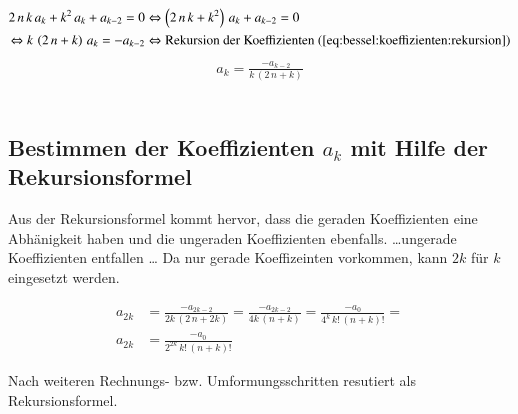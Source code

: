 \begin{align*}
	2 \, n \, k \, a_k
	+
	k^2 \, a_k
	+
	a_{k - 2}
	= 0
	&\Leftrightarrow
	\left(
	2 \, n \, k 
	+
	k^2 
	\right)
	\, a_k
	+
	a_{k - 2}
	= 0 \\
	\Leftrightarrow
	k \,
	\left(
	2 \, n
	+
	k
	\right)
	\, a_k
	= -a_{k - 2}
	&\Leftrightarrow
	\text{Rekursion der Koeffizienten \refeq{eq:bessel:koeffizienten:rekursion}}
\end{align*}
\begin{align}
	a_k
	=
	\frac
	{
		-a_{k - 2}
	}{
		k \, \left( 2 \, n + k \right)	
	}
	\label{eq:bessel:koeffizienten:rekursion}
\end{align}
\\
\subsection[Bestimmen der Koeffizienten $a_k$]{Bestimmen der Koeffizienten $a_k$ mit Hilfe der Rekursionsformel }
\begin{normalsize}
	Aus der Rekursionsformel  kommt hervor,
	dass die geraden Koeffizienten eine Abh\"anigkeit haben und die ungeraden Koeffizienten ebenfalls.
	\dots ungerade Koeffizienten entfallen \dots
	Da nur gerade Koeffizeinten vorkommen,
	kann $2k$ f\"ur $k$ eingesetzt werden.
\end{normalsize}
\begin{align}
	\nonumber
	a_{2k}
	&=
	\frac
	{
		-a_{2k - 2}
	}{
		2k \, \left( 2 \, n + 2k \right)	
	}
	=
	\frac
	{
		-a_{2k - 2}
	}{
		4k \, \left( n + k \right)	
	} 
	=
	\frac
	{
		-a_0
	}{
		4^k \, {k}! \, {\left( n + k \right)}!
	}
	=
	\\
	a_{2k}
	&= 
	\frac
	{
		-a_0
	}{
		2^{2k} \, {k}! \, {\left( n + k \right)}!
	}
	\label{eq:bessel:koeffizienten:gerade}
\end{align}
\begin{normalsize}
	Nach weiteren Rechnungs- \acs{bzw.} Umformungsschritten resutiert  als Rekursionsformel.
\end{normalsize}
